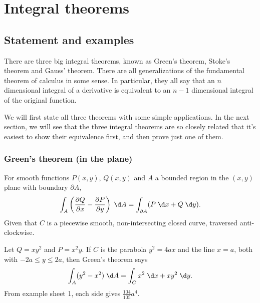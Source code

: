 \documentclass[a4paper]{article}
\begin{document}
\section{Integral theorems}
\subsection{Statement and examples}
There are three big integral theorems, known as Green's theorem, Stoke's theorem and Gauss' theorem. There are all generalizations of the fundamental theorem of calculus in some sense. In particular, they all say that an $n$ dimensional integral of a derivative is equivalent to an $n - 1$ dimensional integral of the original function.

We will first state all three theorems with some simple applications. In the next section, we will see that the three integral theorems are so closely related that it's easiest to show their equivalence first, and then prove just one of them.

\subsubsection{Green's theorem (in the plane)}
\begin{thm}
  For smooth functions $P(x, y)$, $Q(x, y)$ and $A$ a bounded region in the $(x, y)$ plane with boundary $\partial A$,
  \[
    \int_A \left(\frac{\partial Q}{\partial x} - \frac{\partial P}{\partial y}\right)\;\d A = \int_{\partial A}(P\;\d x + Q\;\d y).
  \]
  Given that $C$ is a piecewise smooth, non-intersecting closed curve, traversed anti-clockwise.
\end{thm}

\begin{eg}
  Let $Q = xy^2$ and $P = x^2y$. If $C$ is the parabola $y^2 = 4ax$ and the line $x = a$, both with $-2a \leq y \leq 2a$, then Green's theorem says
  \[
    \int_A (y^2 - x^2)\;\d A = \int_C x^2 \;\d x + xy^2\;\d y.
  \]
  From example sheet 1, each side gives $\frac{104}{105} a^4$.
\end{eg}
\end{document}
